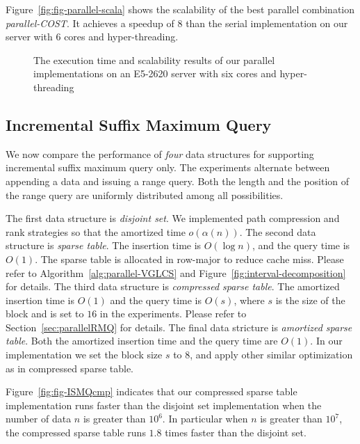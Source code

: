 
Figure~\ref{fig:fig-parallel-scala} shows the scalability of the best
parallel combination {\em parallel-COST}.  It achieves a speedup of
$8$ than the serial implementation on our server with 6 cores and
hyper-threading.

\begin{figure}
  \centering
  \caption{The execution time and scalability results of our parallel
    implementations on an E5-2620 server with six cores and
    hyper-threading}
\end{figure}


\subsection{Incremental Suffix Maximum Query}

We now compare the performance of {\em four} data structures for
supporting incremental suffix maximum query only.  The experiments
alternate between appending a data and issuing a range query.  Both
the length and the position of the range query are uniformly
distributed among all possibilities.

The first data structure is {\em disjoint set}.  We implemented path
compression and rank strategies so that the amortized time
$o(\alpha(n))$.  The second data structure is {\em sparse table}.  The
insertion time is $O(\log n)$, and the query time is $O(1)$.  The
sparse table is allocated in row-major to reduce cache miss.  Please
refer to Algorithm~\ref{alg:parallel-VGLCS} and
Figure~\ref{fig:interval-decomposition} for details.  The third data
structure is {\em compressed sparse table}.  The amortized insertion
time is $O(1)$ and the query time is $O(s)$, where $s$ is the size of
the block and is set to $16$ in the experiments.  Please refer to
Section~\ref{sec:parallelRMQ} for details.  The final data stricture
is {\em amortized sparse table}.  Both the amortized insertion time
and the query time are $O(1)$.  In our implementation we set the block
size $s$ to $8$, and apply other similar optimization as in compressed
sparse table.

Figure~\ref{fig:fig-ISMQcmp} indicates that our compressed sparse
table implementation runs faster than the disjoint set implementation
when the number of data $n$ is greater than $10^6$.  In particular
when $n$ is greater than $10^7$, the compressed sparse table runs
$1.8$ times faster than the disjoint set.

